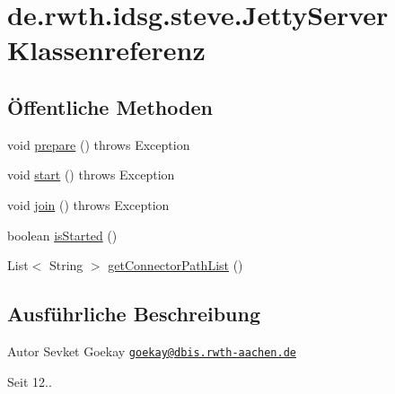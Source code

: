 \hypertarget{classde_1_1rwth_1_1idsg_1_1steve_1_1_jetty_server}{\section{de.\+rwth.\+idsg.\+steve.\+Jetty\+Server Klassenreferenz}
\label{classde_1_1rwth_1_1idsg_1_1steve_1_1_jetty_server}
}
\subsection*{Öffentliche Methoden}
\begin{DoxyCompactItemize}
\item 
void \hyperlink{classde_1_1rwth_1_1idsg_1_1steve_1_1_jetty_server_af3d367767a64addf3ad333b6b870c8b5}{prepare} ()  throws Exception 
\item 
void \hyperlink{classde_1_1rwth_1_1idsg_1_1steve_1_1_jetty_server_a8ef6c91015dbe98a901f843d583f1685}{start} ()  throws Exception 
\item 
void \hyperlink{classde_1_1rwth_1_1idsg_1_1steve_1_1_jetty_server_aa5e5a66ea19ce47cc0363d34700073cd}{join} ()  throws Exception 
\item 
boolean \hyperlink{classde_1_1rwth_1_1idsg_1_1steve_1_1_jetty_server_a8fd83525bd349bd2d3cfb647216c2f9b}{is\+Started} ()
\item 
List$<$ String $>$ \hyperlink{classde_1_1rwth_1_1idsg_1_1steve_1_1_jetty_server_a4c8ee555ae6f61194315876112b02463}{get\+Connector\+Path\+List} ()
\end{DoxyCompactItemize}


\subsection{Ausführliche Beschreibung}
\begin{DoxyAuthor}{Autor}
Sevket Goekay \href{mailto:goekay@dbis.rwth-aachen.de}{\tt goekay@dbis.\+rwth-\/aachen.\+de} 
\end{DoxyAuthor}
\begin{DoxySince}{Seit}
12.. 
\end{DoxySince}


